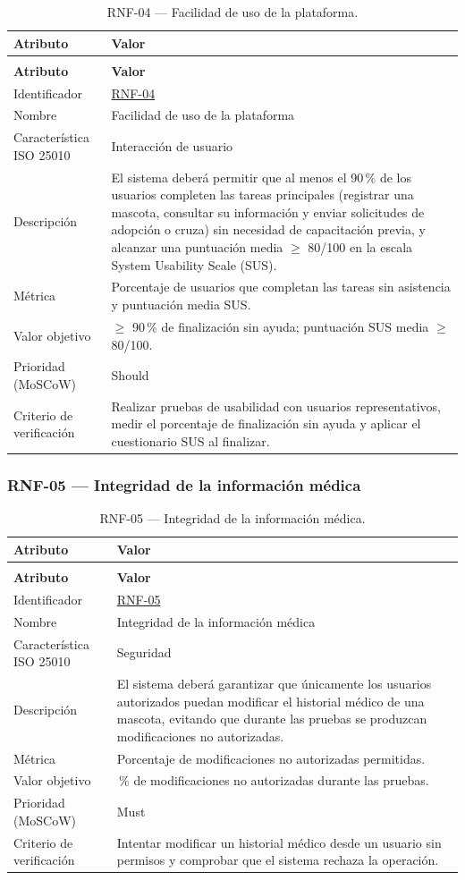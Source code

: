 \documentclass[journal,onecolumn]{IEEEtran}
\makeatletter
\newenvironment{atributos}[2]{%
	\small
	\begin{longtable}{@{}>{\raggedright\arraybackslash}p{4.2cm} >{\raggedright\arraybackslash}p{11.2cm}@{}}
		\caption{#2}\label{tab:#1}\\
		\toprule
		\textbf{Atributo} & \textbf{Valor} \\
		\midrule
		\endfirsthead
		\multicolumn{2}{@{}l}{\small\itshape (continuación)}\\
		\toprule
		\textbf{Atributo} & \textbf{Valor} \\
		\midrule
		\endhead
		\bottomrule
		\endlastfoot
	}{%
	\end{longtable}
	\normalsize
}
\makeatother
\begin{document}
	\begin{atributos}{RNF-04}{RNF-04 --- Facilidad de uso de la plataforma.}
		Identificador & \hyperref[tab:RNF-04]{RNF-04} \\
		Nombre & Facilidad de uso de la plataforma \\
		Característica ISO 25010 & Interacción de usuario \\
		Descripción & El sistema deberá permitir que al menos el 90\,\% de los usuarios completen las tareas principales (registrar una mascota, consultar su información y enviar solicitudes de adopción o cruza) sin necesidad de capacitación previa, y alcanzar una puntuación media $\geq$ 80/100 en la escala System Usability Scale (SUS). \\
		Métrica & Porcentaje de usuarios que completan las tareas sin asistencia y puntuación media SUS. \\
		Valor objetivo & $\geq$ 90\,\% de finalización sin ayuda; puntuación SUS media $\geq$ 80/100. \\
		Prioridad (MoSCoW) & Should \\
		Criterio de verificación & Realizar pruebas de usabilidad con usuarios representativos, medir el porcentaje de finalización sin ayuda y aplicar el cuestionario SUS al finalizar. \\
	\end{atributos}
	
	\subsubsection{RNF-05 --- Integridad de la información médica}
	
	\begin{atributos}{RNF-05}{RNF-05 --- Integridad de la información médica.}
		Identificador & \hyperref[tab:RNF-05]{RNF-05} \\
		Nombre & Integridad de la información médica \\
		Característica ISO 25010 & Seguridad \\
		Descripción & El sistema deberá garantizar que únicamente los usuarios autorizados puedan modificar el historial médico de una mascota, evitando que durante las pruebas se produzcan modificaciones no autorizadas. \\
		Métrica & Porcentaje de modificaciones no autorizadas permitidas. \\
		Valor objetivo & 0\,\% de modificaciones no autorizadas durante las pruebas. \\
		Prioridad (MoSCoW) & Must \\
		Criterio de verificación & Intentar modificar un historial médico desde un usuario sin permisos y comprobar que el sistema rechaza la operación. \\
	\end{atributos}
	
\end{document}

